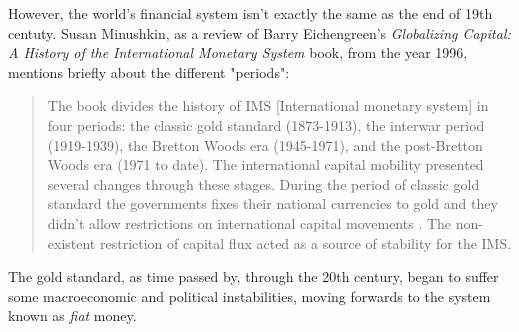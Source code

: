 \documentclass[12pt,a4paper,twoside]{book}
\begin{document}
However, the world's financial system isn't exactly the same as the end of 19th centuty. Susan Minushkin, as a review of Barry Eichengreen's \textit{Globalizing Capital: A History of the International Monetary System} book, from the year 1996, mentions briefly about the different "periods":



\begin{quotation}
The book divides the history of IMS [International monetary system] in four periods: the classic gold standard (1873-1913), the interwar period (1919-1939), the Bretton Woods era (1945-1971), and the post-Bretton Woods era (1971 to date). The international capital mobility presented several changes through these stages. During the period of classic gold standard the governments fixes their national currencies to gold and they didn't allow restrictions on international capital movements . The non-existent restriction of capital flux acted as a source of stability for the IMS. \cite[pág. 275]{susan-capital}
\end{quotation}

The gold standard, as time passed by, through the 20th century, began to suffer some macroeconomic and political instabilities, moving forwards to the system known as \textit{fiat} money.




\end{document}
